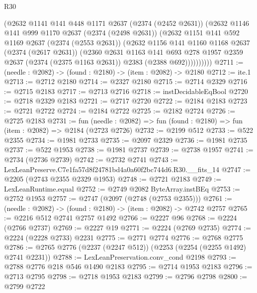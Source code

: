 \begin{lexlean}{R30}
\begin{coremodule}
            (@2632
              @1141
              @141
              @448
              @1171
              @2637
              (@2374 (@2452 @2631))
              (@2632
                @1146
                @141
                @999
                @1170
                @2637
                (@2374 (@2498 @2631))
                (@2632
                  @1151
                  @141
                  @592
                  @1169
                  @2637
                  (@2374 (@2553 @2631))
                  (@2632
                    @1156
                    @141
                    @1160
                    @1168
                    @2637
                    (@2374 (@2617 @2631))
                    (@2360
                      @2631
                      @1163
                      @141
                      @693
                      @278
                      @1957
                      @2359
                      @2637
                      (@2374 (@2375 @1163 @2631))
                      @2383
                      (@2388 @692))))))))))
@2711 := (needle : @2082) -> (found : @2180) -> (item : @2082) -> @2180
@2712 := ite.{1}
@2713 := @2712 @2180
@2714 := @2327 @2180
@2715 := @2714 @2329
@2716 := @2715 @2183
@2717 := @2713 @2716
@2718 := instDecidableEqBool
@2720 := @2718 @2329 @2183
@2721 := @2717 @2720
@2722 := @2184 @2183
@2723 := @2721 @2722
@2724 := @2184 @2722
@2725 := @2182 @2724
@2726 := @2725 @2183
@2731 := fun (needle : @2082) => fun (found : @2180) => fun (item : @2082) => @2184 (@2723 @2726)
@2732 := @2199 @512
@2733 := @522 @2355
@2734 := @1981 @2733
@2735 := @2097 @2329
@2736 := @1981 @2735
@2737 := @522 @1953
@2738 := @1981 @2737
@2739 := @2738 @1957
@2741 := @2734 (@2736 @2739)
@2742 := @2732 @2741
@2743 := LexLeanPreserve.C7e1fa57d8f24781bd4a0a60f2bc744d6.R30.__fits_14
@2747 := @2205 (@2743 @2355 @2329 @1953)
@2748 := @2721 @2183
@2749 := LexLeanRuntime.equal
@2752 := @2749 @2082 ByteArray.instBEq
@2753 := @2752 @1953
@2757 := @2747 (@2097 (@2748 (@2753 @2355)))
@2761 := (needle : @2082) -> (found : @2180) -> (item : @2082) -> @2742 @2757
@2765 := @2216 @512 @2741 @2757 @1492
@2766 := @2227 @96
@2768 := @2224 (@2766 @2737)
@2769 := @2227 @19
@2771 := @2224 (@2769 @2735)
@2774 := @2224 (@2228 @2733) @2231
@2775 := @2771 @2774
@2776 := @2768 @2775
@2786 := @2765 @2776 (@2237 (@2247 @512)) (@2253 (@2254 (@2255 @1492) @2741 @2231))
@2788 := LexLeanPreservation.conv_cond @2198
@2793 := @2788 @2776 @218 @546 @1490 @2183
@2795 := @2714 @1953 @2183
@2796 := @2713 @2795
@2798 := @2718 @1953 @2183
@2799 := @2796 @2798
@2800 := @2799 @2722

\end{coremodule}
\end{lexlean}
